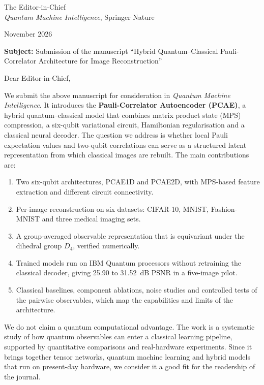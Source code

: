 \documentclass[11pt,a4paper]{article}
\begin{document}
\vspace*{3.2cm}

\begin{minipage}[t]{0.65\textwidth}
The Editor-in-Chief\\
\textit{Quantum Machine Intelligence}, Springer Nature
\end{minipage}%
\hfill
\begin{minipage}[t]{0.3\textwidth}
 November 2026
\end{minipage}

\medskip
\textbf{Subject:} Submission of the manuscript ``Hybrid Quantum--Classical
Pauli-Correlator Architecture for Image Reconstruction''

Dear Editor-in-Chief,

We submit the above manuscript for consideration in
\textit{Quantum Machine Intelligence}. It introduces the
\textbf{Pauli-Correlator Autoencoder (PCAE)}, a hybrid quantum--classical
model that combines matrix product state (MPS) compression, a six-qubit
variational circuit, Hamiltonian regularisation and a classical neural
decoder. The question we address is whether local Pauli expectation values
and two-qubit correlations can serve as a structured latent representation
from which classical images are rebuilt. The main contributions are:

\begin{enumerate}[leftmargin=*, itemsep=1pt, topsep=2pt, parsep=0pt]
\item Two six-qubit architectures, PCAE1D and PCAE2D, with MPS-based
  feature extraction and different circuit connectivity.
\item Per-image reconstruction on six datasets: CIFAR-10, MNIST,
  Fashion-MNIST and three medical imaging sets.
\item A group-averaged observable representation that is equivariant under
  the dihedral group $D_4$, verified numerically.
\item Trained models run on IBM Quantum processors without retraining the
  classical decoder, giving 25.90 to 31.52~dB PSNR in a five-image pilot.
\item Classical baselines, component ablations, noise studies and controlled
  tests of the pairwise observables, which map the capabilities and limits
  of the architecture.
\end{enumerate}

We do not claim a quantum computational advantage. The work is a
systematic study of how quantum observables can enter a classical learning
pipeline, supported by quantitative comparisons and real-hardware
experiments. Since it brings together tensor networks, quantum machine
learning and hybrid models that run on present-day hardware, we consider it
a good fit for the readership of the journal.
\end{document}
